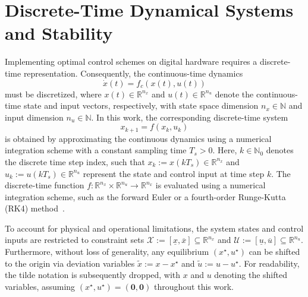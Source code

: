 \section{Discrete-Time Dynamical Systems and Stability}
\label{sec:discrete-sys-stability}

Implementing optimal control schemes on digital hardware requires a discrete-time representation. 
Consequently, the continuous-time dynamics
\begin{equation}
    \label{eq:continuous-time-system}
    \dot{x}(t) = f_c(x(t), u(t))
\end{equation}
must be discretized, where $x(t) \in \mathbb{R}^{n_x}$ and 
$u(t) \in \mathbb{R}^{n_u}$ denote the continuous-time state and input vectors, respectively, 
with state space dimension $n_x \in \mathbb{N}$ and input dimension $n_u \in \mathbb{N}$.
In this work, the corresponding discrete-time system
\begin{equation}
    \label{eq:discrete-time-system}
    x_{k+1} = f(x_k, u_k)
\end{equation}
is obtained by approximating the continuous dynamics using a numerical integration scheme with a constant sampling time $T_s > 0$. 
Here, $k \in \mathbb{N}_0$ denotes the discrete time step index, such that $x_k := x(k T_s) \in \mathbb{R}^{n_x}$ and 
$u_k := u(k T_s) \in \mathbb{R}^{n_u}$ represent the state and control input at time step $k$. 
The discrete-time function $f: \mathbb{R}^{n_x} \times \mathbb{R}^{n_u} \to \mathbb{R}^{n_x}$ is evaluated using a 
numerical integration scheme, such as the forward Euler or a fourth-order Runge-Kutta (RK4) 
method~\cite{butcherNumericalMethodsOrdinary2016}.

To account for physical and operational limitations, the system states and control inputs are restricted to 
constraint sets $\mathcal{X} := [\underline{x}, \overline{x}] \subseteq \mathbb{R}^{n_x}$ and 
$\mathcal{U} := [\underline{u}, \overline{u}] \subseteq \mathbb{R}^{n_u}$. 
Furthermore, without loss of generality, any equilibrium $(x^\star, u^\star)$ can be shifted to the origin 
via deviation variables $\tilde{x} := x - x^\star$ and $\tilde{u} := u - u^\star$. For readability, 
the tilde notation is subsequently dropped, with $x$ and $u$ denoting the shifted variables, 
assuming $(x^\star, u^\star) = (\mathbf{0}, \mathbf{0})$ throughout this work.


